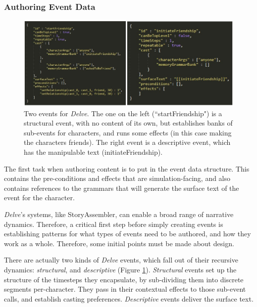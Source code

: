 \subsubsection{Authoring Event Data}\label{subsubsec:delve-authoring-event-data}


\begin{figure}
    \centering
    \includegraphics[width=\textwidth]{figures/4-Delve/structural-and-descriptive-events.jpg}
    \caption{Two events for \textit{Delve}. The one on the left (``startFriendship") is a structural event, with no content of its own, but establishes banks of sub-events for characters, and runs some effects (in this case making the characters friends). The right event is a descriptive event, which has the manipulable text (initiateFriendship).}
    \label{fig:structural-and-descriptive-events}
\end{figure}


The first task when authoring content is to put in the event data structure. This contains the pre-conditions and effects that are simulation-facing, and also contains references to the grammars that will generate the surface text of the event for the character.

\textit{Delve}'s systems, like StoryAssembler, can enable a broad range of narrative dynamics. Therefore, a critical first step before simply creating events is establishing patterns for what types of events need to be authored, and how they work as a whole. Therefore, some initial points must be made about design.

There are actually two kinds of \textit{Delve} events, which fall out of their recursive dynamics: \textit{structural}, and \textit{descriptive} (Figure \ref{fig:structural-and-descriptive-events}). \textit{Structural} events set up the structure of the timesteps they encapsulate, by sub-dividing them into discrete segments per-character. They pass in their contextual effects to those sub-event calls, and establish casting preferences. \textit{Descriptive} events deliver the surface text.

